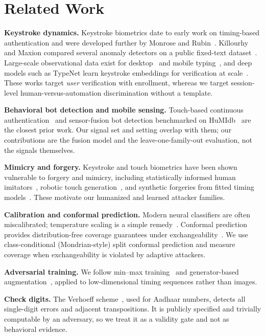 \documentclass[conference]{IEEEtran}
\begin{document}
\section{Related Work}
\textbf{Keystroke dynamics.} Keystroke biometrics date to early work on timing-based authentication and were developed further by Monrose and Rubin~\cite{monrose2000}. Killourhy and Maxion compared several anomaly detectors on a public fixed-text dataset~\cite{killourhy2009}. Large-scale observational data exist for desktop~\cite{dhakal2018} and mobile typing~\cite{palin2019}, and deep models such as TypeNet learn keystroke embeddings for verification at scale~\cite{acien2022typenet}. These works target \emph{user} verification with enrollment, whereas we target session-level human-versus-automation discrimination without a template.

\textbf{Behavioral bot detection and mobile sensing.} Touch-based continuous authentication~\cite{frank2013} and sensor-fusion bot detection benchmarked on HuMIdb~\cite{acien2021becaptcha} are the closest prior work. Our signal set and setting overlap with them; our contributions are the fusion model and the leave-one-family-out evaluation, not the signals themselves.

\textbf{Mimicry and forgery.} Keystroke and touch biometrics have been shown vulnerable to forgery and mimicry, including statistically informed human imitators~\cite{tey2013}, robotic touch generation~\cite{serwadda2013}, and synthetic forgeries from fitted timing models~\cite{stefan2012}. These motivate our humanized and learned attacker families.

\textbf{Calibration and conformal prediction.} Modern neural classifiers are often miscalibrated; temperature scaling is a simple remedy~\cite{guo2017}. Conformal prediction provides distribution-free coverage guarantees under exchangeability~\cite{vovk2005,angelopoulos2021}. We use class-conditional (Mondrian-style) split conformal prediction and measure coverage when exchangeability is violated by adaptive attackers.

\textbf{Adversarial training.} We follow min--max training~\cite{madry2018} and generator-based augmentation~\cite{goodfellow2014}, applied to low-dimensional timing sequences rather than images.

\textbf{Check digits.} The Verhoeff scheme~\cite{verhoeff1969}, used for Aadhaar numbers, detects all single-digit errors and adjacent transpositions. It is publicly specified and trivially computable by an adversary, so we treat it as a validity gate and not as behavioral evidence.
\end{document}
